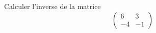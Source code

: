 Calculer l'inverse de la matrice
\begin{displaymath}
 \begin{pmatrix}
  6 & 3 \\ -4 & -1
 \end{pmatrix}
\end{displaymath}
\bigskip \bigskip \bigskip \bigskip